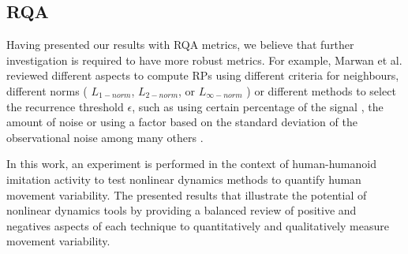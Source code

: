 \subsection{RQA}
Having presented our results with RQA metrics, we believe that further investigation 
is required to have more robust metrics. For example, Marwan et al. \cite{marwan2007, marwan2015} 
reviewed different aspects to compute RPs using different criteria for neighbours, 
different norms ( $L_{1-norm}$, $L_{2-norm}$, or $L_{\infty-norm}$ ) or 
different methods to select the recurrence threshold $\epsilon$, such as using certain percentage 
of the signal \cite{letellier2006}, the amount of noise or using a factor based 
on the standard deviation of the observational noise among many others \cite{marwan2007}.











%
%

In this work, an experiment is performed in the context of human-humanoid imitation activity
to test nonlinear dynamics methods to quantify human movement variability. 
The presented results that illustrate the potential of nonlinear dynamics tools 
by providing a balanced review of positive and negatives aspects of each 
technique to quantitatively and qualitatively measure movement variability.

